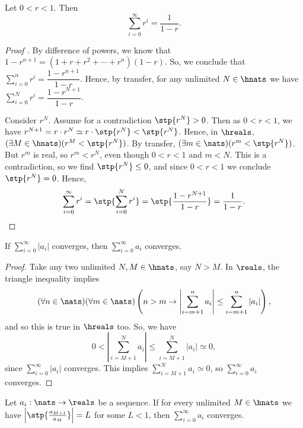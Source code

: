 \begin{thm}\label{GeometricSeries}
    Let $0 < r < 1$. Then 
    \[ \sum_{i = 0}^\infty r^i = \frac{1}{1-r}. \]
\end{thm}

\begin{proof}[Proof ]
    By difference of powers, we know that $1 - r^{n+1} = (1 + r + r^2 + \cdots + r^n)(1-r)$. So, we conclude that $\sum_{i=0}^n r^i = \dfrac{1-r^{n+1}}{1-r}$. Hence, by transfer, for any unlimited $N \in \hnats$ we have $\sum_{i=0}^N r^i = \dfrac{1-r^{N+1}}{1-r}$. 

    Consider $r^{N}$. Assume for a contradiction $\stp{r^N} > 0$. Then as $0 < r < 1$, we have $r^{N+1} = r \cdot r^N \simeq r\cdot \stp{r^N} < \stp{r^N}$. Hence, in $\hreals$, $(\exists M \in \hnats)(r^M < \stp{r^N})$. By transfer, $(\exists m \in \nats)(r^m < \stp{r^N})$. But $r^m$ is real, so $r^m < r^N$, even though $0 < r < 1$ and $m < N$. This is a contradiction, so we find $\stp{r^N} \leq 0$, and since $0 < r < 1$ we conclude $\stp{r^N} = 0$. Hence, 
    \[\sum_{i=0}^\infty r^i = \stp{\sum_{i=0}^N r^i} = \stp{\frac{1-r^{N+1}}{1-r}} = \frac{1}{1-r}. \]
\end{proof}

\begin{thm}\label{AbsoluteConvergenceImpliesConvergence}
    If $\sum_{i = 0}^\infty |a_i|$ converges, then $\sum_{i = 0}^\infty a_i$ converges.
\end{thm}

\begin{proof}
    Take any two unlimited $N, M \in \hnats$, say $N > M$. In $\reals$, the triangle inequality implies \[(\forall n \in \nats)(\forall m \in \nats)\left(n > m \to \left|\sum_{i = m + 1}^n a_i \right| \leq \sum_{i = m + 1}^n  |a_i|\right),\]
    and so this is true in $\hreals$ too. So, we have 
    \[0 < \left|\sum_{i=M+1}^N a_i\right| \leq \sum_{i=M+1}^N |a_i| \simeq 0,\]
    since $\sum_{i=0}^\infty |a_i|$ converges. This implies $\sum_{i=M+1}^N a_i \simeq 0$, so $\sum_{i=0}^\infty a_i$ converges.
\end{proof}

\begin{thm}\label{RatioTest}
    Let $a_i: \nats \to \reals$ be a sequence. If for every unlimited $M \in \hnats$ we have $\left|\stp{\frac{a_{M+1}}{a_M}}\right| = L$ for some $L < 1$, then $\sum_{i=0}^\infty a_i$ converges.
\end{thm}


